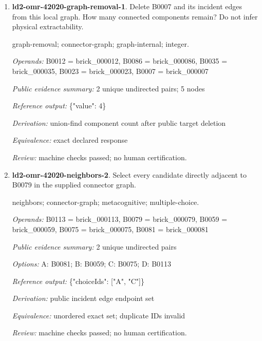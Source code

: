 \begin{enumerate}
\par{\small neighbors; connector-graph; metacognitive; multiple-choice.\par\textit{Operands:} B0035 = brick\_000035, B0007 = brick\_000007, B0012 = brick\_000012, B0086 = brick\_000086, B0023 = brick\_000023\par\textit{Public evidence summary:} 2 unique undirected pairs\par\textit{Options:} A: B0012; B: B0023; C: B0035; D: B0086\par\textit{Reference output:} \{"choiceIds": ["A", "C"]\}\par\textit{Derivation:} public incident edge endpoint set\par\textit{Equivalence:} unordered exact set; duplicate IDs invalid\par\textit{Review:} machine checks passed; no human certification.}
\item \textbf{ld2-omr-42020-graph-removal-1}. Delete B0007 and its incident edges from this local graph. How many connected components remain? Do not infer physical extractability.
\par{\small graph-removal; connector-graph; graph-internal; integer.\par\textit{Operands:} B0012 = brick\_000012, B0086 = brick\_000086, B0035 = brick\_000035, B0023 = brick\_000023, B0007 = brick\_000007\par\textit{Public evidence summary:} 2 unique undirected pairs; 5 nodes\par\textit{Reference output:} \{"value": 4\}\par\textit{Derivation:} union-find component count after public target deletion\par\textit{Equivalence:} exact declared response\par\textit{Review:} machine checks passed; no human certification.}
\item \textbf{ld2-omr-42020-neighbors-2}. Select every candidate directly adjacent to B0079 in the supplied connector graph.
\par{\small neighbors; connector-graph; metacognitive; multiple-choice.\par\textit{Operands:} B0113 = brick\_000113, B0079 = brick\_000079, B0059 = brick\_000059, B0075 = brick\_000075, B0081 = brick\_000081\par\textit{Public evidence summary:} 2 unique undirected pairs\par\textit{Options:} A: B0081; B: B0059; C: B0075; D: B0113\par\textit{Reference output:} \{"choiceIds": ["A", "C"]\}\par\textit{Derivation:} public incident edge endpoint set\par\textit{Equivalence:} unordered exact set; duplicate IDs invalid\par\textit{Review:} machine checks passed; no human certification.}

\end{enumerate}
